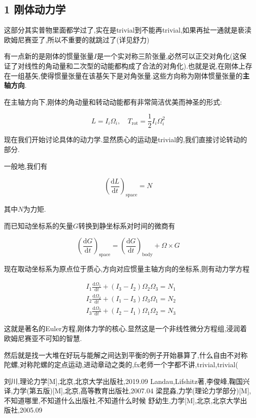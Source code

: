 \documentclass[UTF8]{article}
\newcommand{\D}{\mathrm{d}}
\begin{document}
	\newpage
	
	
	
\subsection*{1 刚体动力学}
	
	这部分其实普物里面都学过了,实在是trivial到不能再trivial,如果再扯一通就是亵渎欧姆尼赛亚了,所以不重要的就跳过了(详见舒力\cite{ShuYouSheng})
	
	有一点新的是刚体的惯量张量$I$是一个实对称三阶张量,必然可以正交对角化(这保证了对线性的角动量和二次型的动能都构成了合法的对角化).也就是说,在刚体上存在一组基矢,使得惯量张量在该基矢下是对角张量.这些方向称为刚体惯量张量的\textbf{主轴方向}.
	
	在主轴方向下,刚体的角动量和转动动能都有非常简洁优美而神圣的形式:
	
	\[L= I_i\Omega_i,\quad T_{\mathrm{rot}}=\frac{1}{2}I_i\Omega_i^2\]
	
	现在我们开始讨论具体的动力学.显然质心的运动是trivial的,我们直接讨论转动的部分.
	
	一般地,我们有
	
	\[\left(\frac{\D L}{\D t}\right)_{\mathrm{space}}=N\]
	
	其中$N$为力矩.
	
	而已知动坐标系的矢量$G$转换到静坐标系对时间的微商有
	
	\[\left(\frac{\D G}{\D t}\right)_{\mathrm{space}}=\left(\frac{\D G}{\D t}\right)_{\mathrm{body}}+\Omega\times G\]
	
	现在取动坐标系为原点位于质心,方向对应惯量主轴方向的坐标系,则有动力学方程
	
	\[
	\begin{aligned}
		&I_{1} \frac{\mathrm{d} \Omega_{1}}{\mathrm{d} t}+(I_{3}-I_{2}) \Omega_{2} \Omega_{3}=N_{1} \\
		&I_{2} \frac{\mathrm{d} \Omega_{2}}{\mathrm{d} t}+(I_{1}-I_{3}) \Omega_{3} \Omega_{1}=N_{2} \\
		&I_{3} \frac{\mathrm{d} \Omega_{3}}{\mathrm{d} t}+(I_{2}-I_{1}) \Omega_{1} \Omega_{2}=N_{3}
	\end{aligned}
	\]
	
	这就是著名的Euler方程,刚体力学的核心.显然这是一个非线性微分方程组,浸润着欧姆尼赛亚不可知的智慧.
	
	然后就是找一大堆在好玩与能解之间达到平衡的例子开始暴算了,什么自由不对称陀螺,对称陀螺的定点运动,进动章动之类的,fx老师一个字都不讲,trivial,trivial(
	
	\newpage
	
	
	
	
	
	\begin{thebibliography}{?}
		 刘川,理论力学[M],北京,北京大学出版社,2019.09
		 Landau,Lifshitz著,李俊峰,鞠国兴译,力学(第五版)[M],北京,高等教育出版社,2007.04
		 梁昆淼,力学(理论力学部分)[M],不知道哪里,不知道什么出版社,不知道什么时候
		 舒幼生,力学[M],北京,北京大学出版社,2005.09
	\end{thebibliography}
	
	
	
	
	
	
\end{document}
